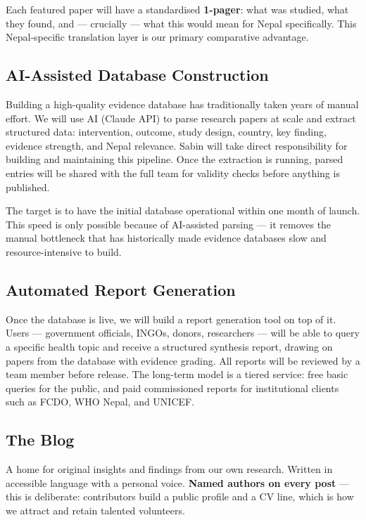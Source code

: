 \documentclass[11pt, a4paper]{article}
\begin{document}
Each featured paper will have a standardised \textbf{1-pager}: what was studied, what they found, and --- crucially --- what this would mean for Nepal specifically. This Nepal-specific translation layer is our primary comparative advantage.

\subsection{AI-Assisted Database Construction}

Building a high-quality evidence database has traditionally taken years of manual effort. We will use AI (Claude API) to parse research papers at scale and extract structured data: intervention, outcome, study design, country, key finding, evidence strength, and Nepal relevance. Sabin will take direct responsibility for building and maintaining this pipeline. Once the extraction is running, parsed entries will be shared with the full team for validity checks before anything is published.

The target is to have the initial database operational within one month of launch. This speed is only possible because of AI-assisted parsing --- it removes the manual bottleneck that has historically made evidence databases slow and resource-intensive to build.

\subsection{Automated Report Generation}

Once the database is live, we will build a report generation tool on top of it. Users --- government officials, INGOs, donors, researchers --- will be able to query a specific health topic and receive a structured synthesis report, drawing on papers from the database with evidence grading. All reports will be reviewed by a team member before release. The long-term model is a tiered service: free basic queries for the public, and paid commissioned reports for institutional clients such as FCDO, WHO Nepal, and UNICEF.

\subsection{The Blog}

A home for original insights and findings from our own research. Written in accessible language with a personal voice. \textbf{Named authors on every post} --- this is deliberate: contributors build a public profile and a CV line, which is how we attract and retain talented volunteers.
\end{document}
